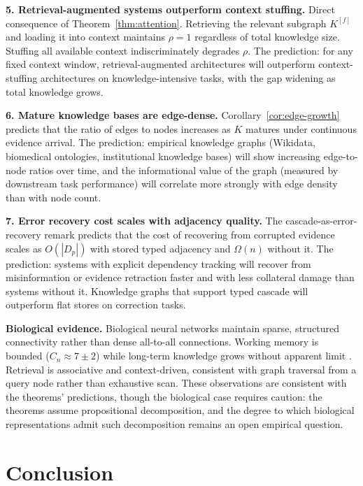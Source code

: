 \documentclass[11pt]{article}
\theoremstyle{definition}
\begin{document}
\textbf{5. Retrieval-augmented systems outperform context stuffing.}
Direct consequence of Theorem~\ref{thm:attention}. Retrieving the
relevant subgraph $K^{[f]}$ and loading it into context maintains
$\rho = 1$ regardless of total knowledge size. Stuffing all available
context indiscriminately degrades $\rho$. The prediction: for any fixed
context window, retrieval-augmented architectures will outperform
context-stuffing architectures on knowledge-intensive tasks, with the
gap widening as total knowledge grows.

\textbf{6. Mature knowledge bases are edge-dense.}
Corollary~\ref{cor:edge-growth} predicts that the ratio of edges to
nodes increases as $K$ matures under continuous evidence arrival. The
prediction: empirical knowledge graphs (Wikidata, biomedical
ontologies, institutional knowledge bases) will show increasing
edge-to-node ratios over time, and the informational value of the graph
(measured by downstream task performance) will correlate more strongly
with edge density than with node count.

\textbf{7. Error recovery cost scales with adjacency quality.}
The cascade-as-error-recovery remark predicts that the cost of
recovering from corrupted evidence scales as $O(|D_p|)$ with stored
typed adjacency and $\Omega(n)$ without it. The prediction: systems
with explicit dependency tracking will recover from misinformation or
evidence retraction faster and with less collateral damage than systems
without it. Knowledge graphs that support typed cascade will outperform
flat stores on correction tasks.

\textbf{Biological evidence.}
Biological neural networks maintain sparse, structured connectivity
rather than dense all-to-all connections. Working memory is bounded
($C_n \approx 7 \pm 2$) while long-term knowledge grows without
apparent limit \cite{Miller1956}. Retrieval is associative and
context-driven, consistent with graph traversal from a query node
rather than exhaustive scan. These observations are consistent with
the theorems' predictions, though the biological case requires
caution: the theorems assume propositional decomposition, and the
degree to which biological representations admit such decomposition
remains an open empirical question.

\section{Conclusion}
\label{sec:conclusion}
\end{document}
